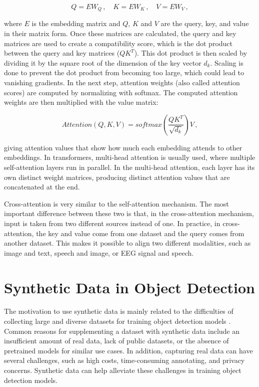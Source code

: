 \begin{equation}
    Q = E W_Q \,, \quad K = E W_K \,, \quad V = E W_V \,,
\end{equation}

where $E$ is the embedding matrix and $Q$, $K$ and $V$ are the query, key, and value in their matrix form. \cite{transformerBERTGPT} Once these matrices are calculated, the query and key matrices are used to create a compatibility score, which is the dot product between the query and key matrices ($QK^T$). This dot product is then scaled by dividing it by the square root of the dimension of the key vector $d_k$. Scaling is done to prevent the dot product from becoming too large, which could lead to vanishing gradients. In the next step, attention weights (also called attention scores) are computed by normalizing with softmax. \cite{bernhard2023alternativesscaleddotproduct} The computed attention weights are then multiplied with the value matrix:

\begin{equation}
    Attention(Q,K,V) = softmax\left(\frac{QK^T}{\sqrt{d_k}}\right)V \,,
\end{equation}

giving attention values that show how much each embedding attends to other embeddings. In transformers, multi-head attention is usually used, where multiple self-attention layers run in parallel. In the multi-head attention, each layer has its own distinct weight matrices, producing distinct attention values that are concatenated at the end. \cite{vaswani2023attentionneed}

Cross-attention is very similar to the self-attention mechanism. The most important difference between these two is that, in the cross-attention mechanism, input is taken from two different sources instead of one. In practice, in cross-attention, the key and value come from one dataset and the query comes from another dataset. This makes it possible to align two different modalities, such as image and text, speech and image, or EEG signal and speech. \cite{CLIP, 10191393, desilva2024neurospexneuroguidedspeakerextraction}

\section{Synthetic Data in Object Detection}
\label{sec:synthetic_data_object_detection}

The motivation to use synthetic data is mainly related to the difficulties of collecting large and diverse datasets for training object detection models \cite{voetman2023bigdatamythusing}. Common reasons for supplementing a dataset with synthetic data include an insufficient amount of real data, lack of public datasets, or the absence of pretrained models for similar use cases. In addition, capturing real data can have several challenges, such as high costs, time-consuming annotating, and privacy concerns. Synthetic data can help alleviate these challenges in training object detection models. \cite{kiefer2021leveragingsyntheticdataobject, Delussu2024synthetic, nguyen2024application}

